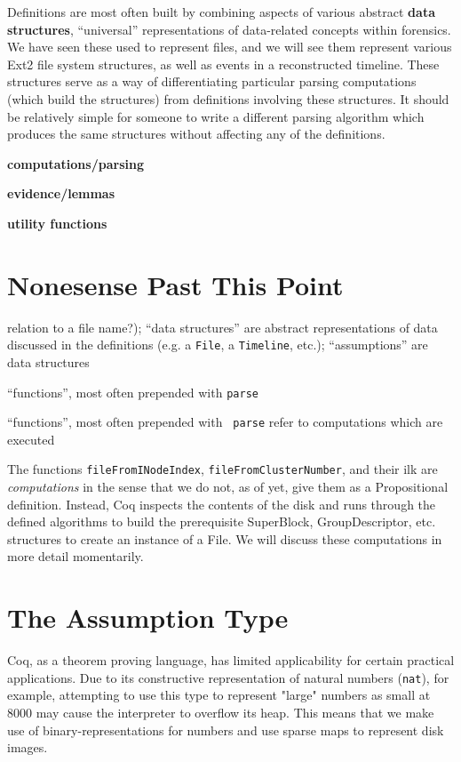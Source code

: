 \documentclass[nocopyrightspace]{sigplanconf}
\begin{document}
Definitions are most often built by combining aspects of various abstract {\bf
data structures}, ``universal'' representations of data-related concepts
within forensics. We have seen these used to represent files, and we will see
them represent various Ext2 file system structures, as well as events in a
reconstructed timeline. These structures serve as a way of differentiating
particular parsing computations (which build the structures) from definitions
involving these structures. It should be relatively simple for someone to
write a different parsing algorithm which produces the same structures without
affecting any of the definitions.

{\bf computations/parsing}

{\bf evidence/lemmas}

{\bf utility functions}

\section{Nonesense Past This Point}

relation to a file name?); ``data structures'' are abstract representations of
data discussed in the definitions (e.g. a {\tt File}, a {\tt Timeline}, etc.);
``assumptions'' are data structures 

``functions'', most often prepended with {\tt parse} 

``functions'', most often prepended with {\tt
parse} refer to computations which are executed



The functions {\tt fileFromINodeIndex}, {\tt fileFromClusterNumber}, and their
ilk are {\it computations} in the sense that we do not, as of yet, give them
as a Propositional definition. Instead, Coq inspects the contents of the disk
and runs through the defined algorithms to build the prerequisite SuperBlock,
GroupDescriptor, etc. structures to create an instance of a File. We will
discuss these computations in more detail momentarily.


\section{The Assumption Type}

Coq, as a theorem proving language, has limited applicability for certain
practical applications. Due to its constructive representation of natural
numbers ({\tt nat}), for example, attempting to use this type to represent
"large" numbers as small at 8000 may cause the interpreter to overflow its
heap. This means that we make use of binary-representations for numbers and
use sparse maps to represent disk images. 
\end{document}
